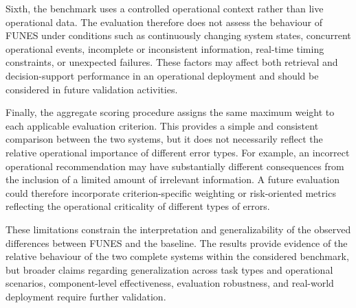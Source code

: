 Sixth, the benchmark uses a controlled operational context rather than live operational data. The evaluation therefore does not assess the behaviour of FUNES under conditions such as continuously changing system states, concurrent operational events, incomplete or inconsistent information, real-time timing constraints, or unexpected failures. These factors may affect both retrieval and decision-support performance in an operational deployment and should be considered in future validation activities.

Finally, the aggregate scoring procedure assigns the same maximum weight to each applicable evaluation criterion. This provides a simple and consistent comparison between the two systems, but it does not necessarily reflect the relative operational importance of different error types. For example, an incorrect operational recommendation may have substantially different consequences from the inclusion of a limited amount of irrelevant information. A future evaluation could therefore incorporate criterion-specific weighting or risk-oriented metrics reflecting the operational criticality of different types of errors.

These limitations constrain the interpretation and generalizability of the observed differences between FUNES and the baseline. The results provide evidence of the relative behaviour of the two complete systems within the considered benchmark, but broader claims regarding generalization across task types and operational scenarios, component-level effectiveness, evaluation robustness, and real-world deployment require further validation.

